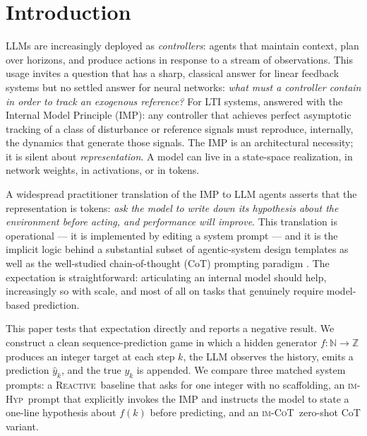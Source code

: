 \documentclass[11pt]{article}
\newcommand{\imhyp}{\textsc{im-Hyp}}
\newcommand{\imcot}{\textsc{im-CoT}}
\newcommand{\reactive}{\textsc{Reactive}}
\begin{document}
\begin{abstract}
\bigskip
\noindent\textbf{Keywords:} internal model principle, large
language models, sequence prediction, code debugging, prompt
engineering, chain-of-thought, control theory, scaling, negative
result, reproducibility.
\end{abstract}

\section{Introduction}
\label{sec:intro}

LLMs are increasingly deployed as \emph{controllers}: agents that
maintain context, plan over horizons, and produce actions in
response to a stream of observations.  This usage invites a
question that has a sharp, classical answer for linear feedback
systems but no settled answer for neural networks: \emph{what must
a controller contain in order to track an exogenous reference?}
For LTI systems, \citet{francis1976internal} answered with the
Internal Model Principle (IMP):  any controller that achieves
perfect asymptotic tracking of a class of disturbance or reference
signals must reproduce, internally, the dynamics that generate
those signals.  The IMP is an architectural necessity; it is
silent about \emph{representation}.  A model can live in a
state-space realization, in network weights, in activations, or in
tokens.

A widespread practitioner translation of the IMP to LLM agents
asserts that the representation is tokens: \emph{ask the model to
write down its hypothesis about the environment before acting, and
performance will improve}.  This translation is operational --- it
is implemented by editing a system prompt --- and it is the
implicit logic behind a substantial subset of agentic-system
design templates as well as the well-studied chain-of-thought (CoT)
prompting paradigm
\citep{wei2022chain,kojima2022zero,wang2023self}.  The
expectation is straightforward: articulating an internal model
should help, increasingly so with scale, and most of all on tasks
that genuinely require model-based prediction.

This paper tests that expectation directly and reports a
negative result.  We construct a clean sequence-prediction game in
which a hidden generator $f \colon \mathbb{N} \to \mathbb{Z}$
produces an integer target at each step $k$, the LLM observes the
history, emits a prediction $\hat y_k$, and the true $y_k$ is
appended.  We compare three matched system prompts: a
\reactive\ baseline that asks for one integer with no scaffolding,
an \imhyp\ prompt that explicitly invokes the IMP and instructs the
model to state a one-line hypothesis about $f(k)$ before predicting,
and an \imcot\ zero-shot CoT variant.
\end{document}
